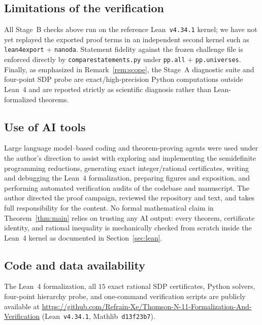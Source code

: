 \documentclass[11pt,reqno]{amsart}
\renewcommand{\_}{\origunderscore\allowbreak}
\theoremstyle{definition}
\begin{document}
\subsection*{Limitations of the verification}
All Stage~B checks above run on the reference Lean~\texttt{v4.34.1} kernel; we have not yet replayed the exported proof terms in an independent second kernel such as \texttt{lean4export} + \texttt{nanoda}. Statement fidelity against the frozen challenge file is enforced directly by \texttt{compare\_statements.py} under \texttt{pp.all} + \texttt{pp.universes}. Finally, as emphasized in Remark~\ref{rem:scope}, the Stage~A diagnostic suite and four-point SDP probe are exact/high-precision Python computations outside Lean~4 and are reported strictly as scientific diagnosis rather than Lean-formalized theorems.

\subsection*{Use of AI tools}
Large language model--based coding and theorem-proving agents were used under the author's direction to assist with exploring and implementing the semidefinite programming reductions, generating exact integer/rational certificates, writing and debugging the Lean~4 formalization, preparing figures and exposition, and performing automated verification audits of the codebase and manuscript. The author directed the proof campaign, reviewed the repository and text, and takes full responsibility for the content. No formal mathematical claim in Theorem~\ref{thm:main} relies on trusting any AI output: every theorem, certificate identity, and rational inequality is mechanically checked from scratch inside the Lean~4 kernel as documented in Section~\ref{sec:lean}.

\subsection*{Code and data availability}
The Lean~4 formalization, all $15$ exact rational SDP certificates, Python solvers, four-point hierarchy probe, and one-command verification scripts are publicly available at \url{https://github.com/Refrain-Xe/Thomson-N-11-Formalization-And-Verification} (Lean~\texttt{v4.34.1}, Mathlib~\texttt{d13f23b7}).
\end{document}
